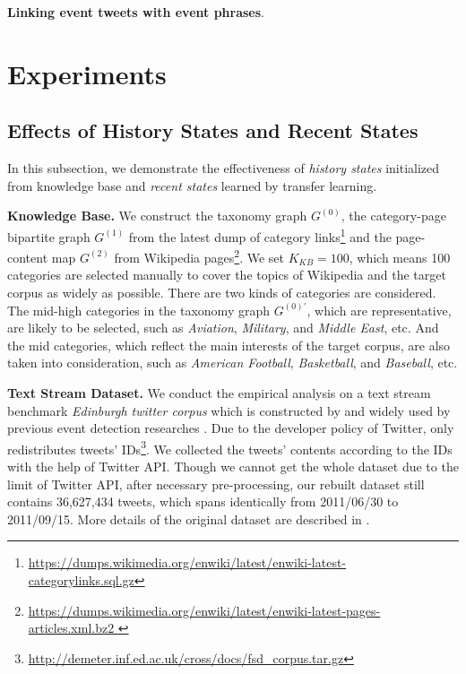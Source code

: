 \documentclass{article}
\begin{document}
\textbf{Linking event tweets with event phrases}. 






\section{Experiments}
\subsection{Effects of History States and Recent States}
In this subsection, we demonstrate the effectiveness of \textit{history states} initialized from knowledge base and \textit{recent states} learned by transfer learning. 

\textbf{Knowledge Base.} 
We construct the taxonomy graph \(G^{(0)}\), the category-page bipartite graph \(G^{(1)}\) from the latest dump of category links\footnote{\url{https://dumps.wikimedia.org/enwiki/latest/enwiki-latest-categorylinks.sql.gz}} and the page-content map \(G^{(2)}\) from Wikipedia pages\footnote{\url{https://dumps.wikimedia.org/enwiki/latest/enwiki-latest-pages-articles.xml.bz2 }}.
We set \(K_{KB}=100\), which means 100 categories are selected manually to cover the topics of Wikipedia and the target corpus as widely as possible. 
There are two kinds of categories are considered. 
The mid-high categories in the taxonomy graph \(G^{(0)'}\), which are representative, are likely to be selected, such as \textit{Aviation}, \textit{Military}, and \textit{Middle East}, etc.
And the mid categories, which reflect the main interests of the target corpus, are also taken into consideration, such as \textit{American Football}, \textit{Basketball}, and \textit{Baseball}, etc. 

\textbf{Text Stream Dataset.} We conduct the empirical analysis on a text stream benchmark \textit{Edinburgh twitter corpus} which is constructed by \cite{petrovic2012using} and widely used by previous event detection researches \cite{petrovic2013can} \cite{Wurzer:2015wq}. 
Due to the developer policy of Twitter, \cite{petrovic2012using} only redistributes tweets' IDs\footnote{\url{http://demeter.inf.ed.ac.uk/cross/docs/fsd_corpus.tar.gz}}.
We collected the tweets' contents according to the IDs with the help of Twitter API. 
Though we cannot get the whole dataset due to the limit of Twitter API, after necessary pre-processing, our rebuilt dataset still contains 36,627,434 tweets, which spans identically from 2011/06/30 to 2011/09/15.
More details of the original dataset are described in \cite{petrovic2010edinburgh}.
\end{document}

